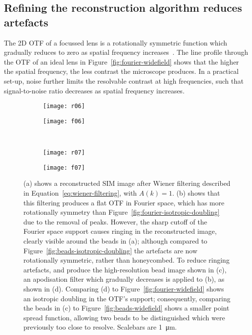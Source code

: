 \subsection{Refining the reconstruction algorithm reduces artefacts} \label{sec:sim-artefacts}
The 2D OTF of a focussed lens is a rotationally symmetric function which gradually reduces to zero as spatial frequency increases~\cite{williams2002introduction}.
The line profile through the OTF of an ideal lens in Figure~\ref{fig:fourier-widefield} shows that the higher the spatial frequency, the less contrast the microscope produces.
In a practical set-up, noise further limits the resolvable contrast at high frequencies, such that signal-to-noise ratio decreases as spatial frequency increases.

\begin{figure}[tbp]
\vspace{-6pt} \centering
\begin{subfigure}[b]{0.45\textwidth}
	\texttt{[image: r06]}
	\caption{}\label{fig:beads-wiener}
\end{subfigure}
\raisebox{9.3em}{\noindent\Huge$\Leftrightarrow$}
\begin{subfigure}[b]{0.45\textwidth}
	\texttt{[image: f06]}
	\caption{}\label{fig:fourier-wiener}
\end{subfigure}

~\newline
\begin{subfigure}[b]{0.45\textwidth}
	\texttt{[image: r07]}
	\caption{}\label{fig:beads-apodised}
\end{subfigure}
\raisebox{9.3em}{\noindent\Huge$\Leftrightarrow$}
\begin{subfigure}[b]{0.45\textwidth}
	\texttt{[image: f07]}
	\caption{}\label{fig:fourier-apodised}
\end{subfigure}
\caption[LAG SIM: Wiener filtering of the SIM OTF is required for artefact-free reconstruction]{(a) shows a reconstructed SIM image after Wiener filtering described in Equation~\ref{eq:wiener-filtering}, with $A\left(k\right) = 1$.
(b) shows that this filtering produces a flat OTF in Fourier space, which has more rotationally symmetry than Figure~\ref{fig:fourier-isotropic-doubling} due to the removal of peaks.
However, the sharp cutoff of the Fourier space support causes ringing in the reconstructed image, clearly visible around the beads in (a); although compared to Figure~\ref{fig:beads-isotropic-doubling} the artefacts are now rotationally symmetric, rather than honeycombed.
To reduce ringing artefacts, and produce the high-resolution bead image shown in (c), an apodisation filter which gradually decreases is applied to (b), as shown in (d).
Comparing (d) to Figure~\ref{fig:fourier-widefield} shows an isotropic doubling in the OTF's support; consequently, comparing the beads in (c) to Figure~\ref{fig:beads-widefield} shows a smaller point spread function, allowing two beads to be distinguished which were previously too close to resolve. Scalebars are \SI{1}{\micro\metre}.}
\label{fig:sim-OTFs}
\end{figure}

